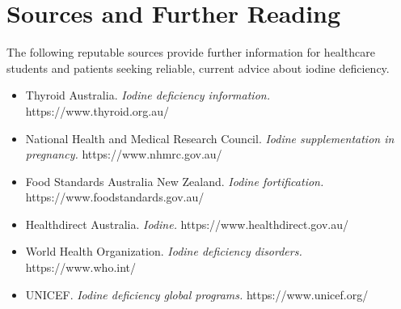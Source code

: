 \section*{Sources and Further Reading}
The following reputable sources provide further information for healthcare students and patients seeking reliable, current advice about iodine deficiency.
\begin{itemize}
    \item Thyroid Australia. \textit{Iodine deficiency information.} https://www.thyroid.org.au/
    \item National Health and Medical Research Council. \textit{Iodine supplementation in pregnancy.} https://www.nhmrc.gov.au/
    \item Food Standards Australia New Zealand. \textit{Iodine fortification.} https://www.foodstandards.gov.au/
    \item Healthdirect Australia. \textit{Iodine.} https://www.healthdirect.gov.au/
    \item World Health Organization. \textit{Iodine deficiency disorders.} https://www.who.int/
    \item UNICEF. \textit{Iodine deficiency global programs.} https://www.unicef.org/
\end{itemize}
